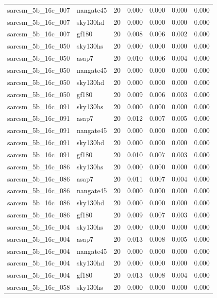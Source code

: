 \begin{tabular}{llrrrrr}
sarcsm\_5b\_16c\_007 & nangate45 & 20 & 0.000 & 0.000 & 0.000 & 0.000 \\
sarcsm\_5b\_16c\_007 & sky130hd & 20 & 0.000 & 0.000 & 0.000 & 0.000 \\
sarcsm\_5b\_16c\_007 & gf180 & 20 & 0.008 & 0.006 & 0.002 & 0.000 \\
sarcsm\_5b\_16c\_050 & sky130hs & 20 & 0.000 & 0.000 & 0.000 & 0.000 \\
sarcsm\_5b\_16c\_050 & asap7 & 20 & 0.010 & 0.006 & 0.004 & 0.000 \\
sarcsm\_5b\_16c\_050 & nangate45 & 20 & 0.000 & 0.000 & 0.000 & 0.000 \\
sarcsm\_5b\_16c\_050 & sky130hd & 20 & 0.000 & 0.000 & 0.000 & 0.000 \\
sarcsm\_5b\_16c\_050 & gf180 & 20 & 0.009 & 0.006 & 0.003 & 0.000 \\
sarcsm\_5b\_16c\_091 & sky130hs & 20 & 0.000 & 0.000 & 0.000 & 0.000 \\
sarcsm\_5b\_16c\_091 & asap7 & 20 & 0.012 & 0.007 & 0.005 & 0.000 \\
sarcsm\_5b\_16c\_091 & nangate45 & 20 & 0.000 & 0.000 & 0.000 & 0.000 \\
sarcsm\_5b\_16c\_091 & sky130hd & 20 & 0.000 & 0.000 & 0.000 & 0.000 \\
sarcsm\_5b\_16c\_091 & gf180 & 20 & 0.010 & 0.007 & 0.003 & 0.000 \\
sarcsm\_5b\_16c\_086 & sky130hs & 20 & 0.000 & 0.000 & 0.000 & 0.000 \\
sarcsm\_5b\_16c\_086 & asap7 & 20 & 0.011 & 0.007 & 0.004 & 0.000 \\
sarcsm\_5b\_16c\_086 & nangate45 & 20 & 0.000 & 0.000 & 0.000 & 0.000 \\
sarcsm\_5b\_16c\_086 & sky130hd & 20 & 0.000 & 0.000 & 0.000 & 0.000 \\
sarcsm\_5b\_16c\_086 & gf180 & 20 & 0.009 & 0.007 & 0.003 & 0.000 \\
sarcsm\_5b\_16c\_004 & sky130hs & 20 & 0.000 & 0.000 & 0.000 & 0.000 \\
sarcsm\_5b\_16c\_004 & asap7 & 20 & 0.013 & 0.008 & 0.005 & 0.000 \\
sarcsm\_5b\_16c\_004 & nangate45 & 20 & 0.000 & 0.000 & 0.000 & 0.000 \\
sarcsm\_5b\_16c\_004 & sky130hd & 20 & 0.000 & 0.000 & 0.000 & 0.000 \\
sarcsm\_5b\_16c\_004 & gf180 & 20 & 0.013 & 0.008 & 0.004 & 0.000 \\
sarcsm\_5b\_16c\_058 & sky130hs & 20 & 0.000 & 0.000 & 0.000 & 0.000 \\

\end{tabular}
